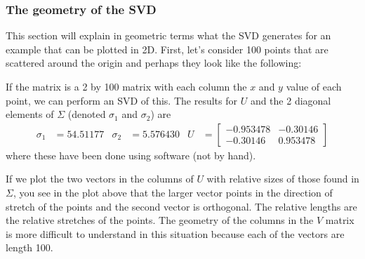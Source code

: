 \subsubsection{The geometry of the SVD} 

This section will explain in geometric terms what the SVD generates for an example that can be plotted in 2D.  First, let's consider 100 points that are scattered around the origin and perhaps they look like the following:

\begin{center}

\end{center}

If the matrix is a 2 by 100 matrix with each column the $x$ and $y$ value of each point, we can perform an SVD of this.  The results for $U$ and the 2 diagonal elements of $\Sigma$ (denoted $\sigma_1$ and $\sigma_2$) are
\begin{align*}
\sigma_1 & = 54.51177 & \sigma_2 & =  
5.576430 & U & = \begin{bmatrix}
-0.953478 & -0.30146\\
-0.30146 & 0.953478 
\end{bmatrix}
\end{align*}
where these have been done using software (not by hand).  

If we plot the two vectors in the columns of $U$ with relative sizes of those found in $\Sigma$, you see in the plot above that the larger vector points in the direction of stretch of the points and the second vector is orthogonal.  The relative lengths are the relative stretches of the points.   The geometry of the columns in the $V$ matrix is more difficult to understand in this situation because each of the vectors are length 100. 

